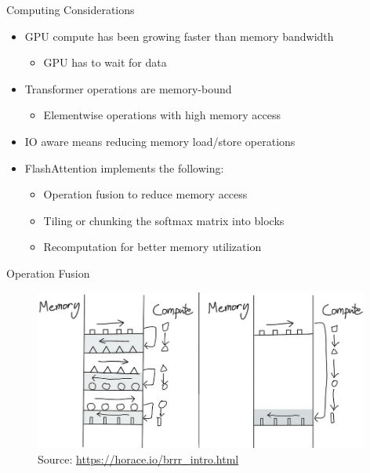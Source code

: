 
\begin{vbframe}{Computing Considerations}

\vfill

\begin{itemize}
	\item GPU compute has been growing faster than memory bandwidth
	\begin{itemize}
		\item GPU has to wait for data
	\end{itemize}
	\item Transformer operations are memory-bound
	\begin{itemize}
		\item Elementwise operations with high memory access
	\end{itemize}
	\item IO aware means reducing memory load/store operations
	\item FlashAttention implements the following:
	\begin{itemize}
		\item Operation fusion to reduce memory access
		\item Tiling or chunking the softmax matrix into blocks
		\item Recomputation for better memory utilization
	\end{itemize}
\end{itemize}

\vfill

\end{vbframe}


\begin{vbframe}{Operation Fusion}

\vfill

\begin{figure}
	\centering
	\includegraphics[width = 11cm]{./figure/op_fusion.png} \\ 
	{\footnotesize Source: \href{https://horace.io/brrr_intro.html}{\url{https://horace.io/brrr_intro.html}}}
\end{figure}

\vfill

\end{vbframe}

